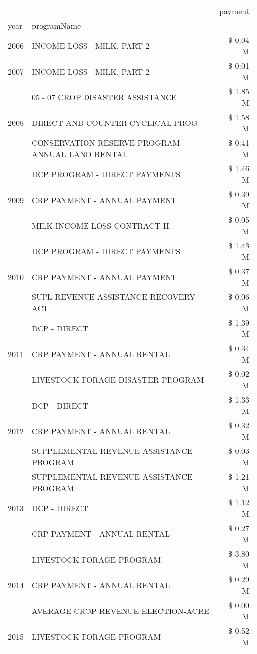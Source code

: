 \begin{tabular}{llr}
\toprule
 &  & payment \\
year & programName &  \\
\midrule
2006 & INCOME LOSS - MILK, PART 2 & \$ 0.04 M \\
\cline{1-3}
2007 & INCOME LOSS - MILK, PART 2 & \$ 0.01 M \\
\cline{1-3}
\multirow[t]{3}{*}{2008} & 05 - 07 CROP DISASTER ASSISTANCE & \$ 1.85 M \\
 & DIRECT AND COUNTER CYCLICAL PROG & \$ 1.58 M \\
 & CONSERVATION RESERVE PROGRAM - ANNUAL LAND RENTAL & \$ 0.41 M \\
\cline{1-3}
\multirow[t]{3}{*}{2009} & DCP PROGRAM - DIRECT PAYMENTS & \$ 1.46 M \\
 & CRP PAYMENT - ANNUAL PAYMENT & \$ 0.39 M \\
 & MILK INCOME LOSS CONTRACT II & \$ 0.05 M \\
\cline{1-3}
\multirow[t]{3}{*}{2010} & DCP PROGRAM - DIRECT PAYMENTS & \$ 1.43 M \\
 & CRP PAYMENT - ANNUAL PAYMENT & \$ 0.37 M \\
 & SUPL REVENUE ASSISTANCE RECOVERY ACT & \$ 0.06 M \\
\cline{1-3}
\multirow[t]{3}{*}{2011} & DCP - DIRECT & \$ 1.39 M \\
 & CRP PAYMENT - ANNUAL RENTAL & \$ 0.34 M \\
 & LIVESTOCK FORAGE DISASTER PROGRAM & \$ 0.02 M \\
\cline{1-3}
\multirow[t]{3}{*}{2012} & DCP - DIRECT & \$ 1.33 M \\
 & CRP PAYMENT - ANNUAL RENTAL & \$ 0.32 M \\
 & SUPPLEMENTAL REVENUE ASSISTANCE PROGRAM & \$ 0.03 M \\
\cline{1-3}
\multirow[t]{3}{*}{2013} & SUPPLEMENTAL REVENUE ASSISTANCE PROGRAM & \$ 1.21 M \\
 & DCP - DIRECT & \$ 1.12 M \\
 & CRP PAYMENT - ANNUAL RENTAL & \$ 0.27 M \\
\cline{1-3}
\multirow[t]{3}{*}{2014} & LIVESTOCK FORAGE PROGRAM & \$ 3.80 M \\
 & CRP PAYMENT - ANNUAL RENTAL & \$ 0.29 M \\
 & AVERAGE CROP REVENUE ELECTION-ACRE & \$ 0.00 M \\
\cline{1-3}
\multirow[t]{3}{*}{2015} & LIVESTOCK FORAGE PROGRAM & \$ 0.52 M \\

\end{tabular}
